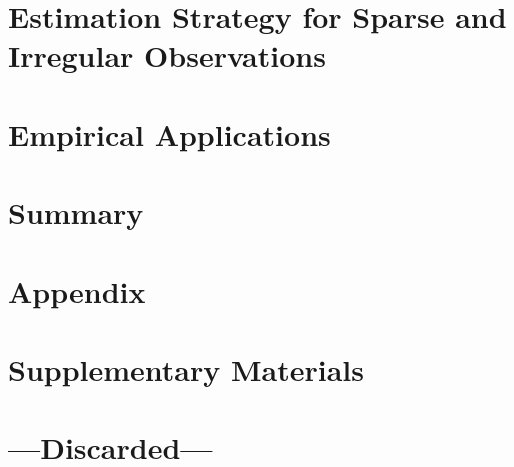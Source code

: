 \documentclass[a4paper,12pt,english,headings=small]{scrreprt}
\theoremstyle{plain}
\theoremstyle{definition}
\theoremstyle{remark}
\theoremstyle{plain}
\begin{document}
\newpage
\chapter{Estimation Strategy for Sparse and Irregular Observations}


\newpage
\chapter{Empirical Applications}


\newpage
\chapter{Summary}



\newpage
\nocite{*}
\printbibliography[heading=bibintoc] %



\newpage
\appendix
\chapter{Appendix}


\newpage
\chapter{Supplementary Materials}


\newpage
\chapter*{---Discarded---}

\end{document}
